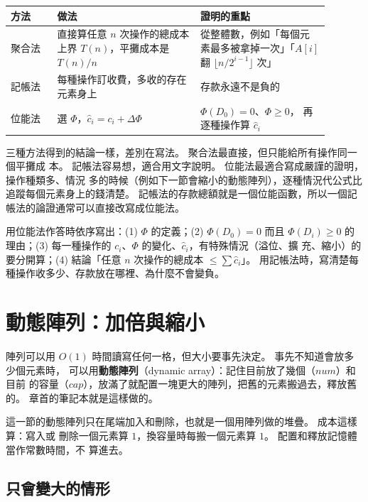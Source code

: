 \begin{center}
\begin{tabular}{p{0.13\linewidth}p{0.40\linewidth}p{0.36\linewidth}}
\toprule
方法 & 做法 & 證明的重點 \\
\midrule
聚合法 & 直接算任意 $n$ 次操作的總成本上界 $T(n)$，平攤成本是 $T(n)/n$ &
從整體數，例如「每個元素最多被拿掉一次」「$A[i]$ 翻 $\lfloor n/2^{i-1} \rfloor$ 次」 \\
記帳法 & 每種操作訂收費，多收的存在元素身上 & 存款永遠不是負的 \\
位能法 & 選 $\Phi$，$\hat{c}_i = c_i + \Delta\Phi$ & $\Phi(D_0) = 0$、$\Phi \ge 0$，
再逐種操作算 $\hat{c}_i$ \\
\bottomrule
\end{tabular}
\end{center}

三種方法得到的結論一樣，差別在寫法。 聚合法最直接，但只能給所有操作同一個平攤成
本。 記帳法容易想，適合用文字說明。 位能法最適合寫成嚴謹的證明，操作種類多、情況
多的時候（例如下一節會縮小的動態陣列），逐種情況代公式比追蹤每個元素身上的錢清楚。
記帳法的存款總額就是一個位能函數，所以一個記帳法的論證通常可以直接改寫成位能法。

\begin{examnote}
用位能法作答時依序寫出：(1) $\Phi$ 的定義；(2) $\Phi(D_0) = 0$ 而且 $\Phi(D_i) \ge
0$ 的理由；(3) 每一種操作的 $c_i$、$\Phi$ 的變化、$\hat{c}_i$，有特殊情況（溢位、擴
充、縮小）的要分開算；(4) 結論「任意 $n$ 次操作的總成本 $\le \sum \hat{c}_i$」。
用記帳法時，寫清楚每種操作收多少、存款放在哪裡、為什麼不會變負。
\end{examnote}

\section{動態陣列：加倍與縮小}
\label{sec:amo-dynarray}

陣列可以用 $O(1)$ 時間讀寫任何一格，但大小要事先決定。 事先不知道會放多少個元素時，
可以用\textbf{動態陣列}（dynamic array）：記住目前放了幾個（$\mathit{num}$）和目前
的容量（$\mathit{cap}$），放滿了就配置一塊更大的陣列，把舊的元素搬過去，釋放舊的。
章首的筆記本就是這樣做的。

這一節的動態陣列只在尾端加入和刪除，也就是一個用陣列做的堆疊。 成本這樣算：寫入或
刪除一個元素算 $1$，換容量時每搬一個元素算 $1$。 配置和釋放記憶體當作常數時間，不
算進去。

\subsection{只會變大的情形}

